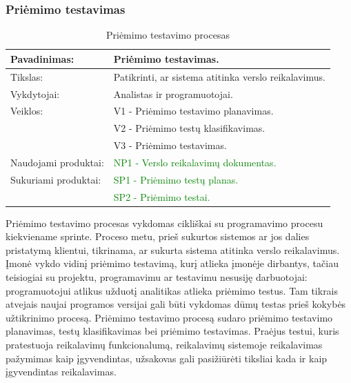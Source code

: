 \documentclass{VUMIFPSkursinis}
\begin{document}
	\subsubsection{Priėmimo testavimas}
	\begin{center}
		\begin{table}[ht]
			\caption{Priėmimo testavimo procesas}
			\begin{tabular}{ | l | l | }
				\hline
				Pavadinimas:		& Priėmimo testavimas.					\\ \hline
				Tikslas:		& Patikrinti, ar sistema atitinka verslo reikalavimus.	\\ \hline
				Vykdytojai:		& Analistas ir programuotojai.				\\ \hline
				Veiklos:		& V1 - Priėmimo testavimo planavimas.			\\
							& V2 - Priėmimo testų klasifikavimas.			\\
							& V3 - Priėmimo testavimas.				\\ \hline
				Naudojami produktai:	& \textcolor{green}{NP1 - Verslo reikalavimų dokumentas.}			\\ \hline
				Sukuriami produktai:	&\textcolor{green}{ SP1 - Priėmimo testų planas.	}			\\
						 	& \textcolor{green}{SP2 - Priėmimo testai.	}			\\ \hline
			\end{tabular}
		\end{table}
	\end{center}
	Priėmimo testavimo procesas vykdomas cikliškai su programavimo procesu kiekviename sprinte.
	Proceso metu, prieš sukurtos sistemos ar jos dalies pristatymą klientui, tikrinama, ar sukurta sistema atitinka verslo reikalavimus.
	Įmonė vykdo vidinį priėmimo testavimą, kurį atlieka įmonėje dirbantys, tačiau teisiogiai su projektu, programavimu ar testavimu nesusiję darbuotojai: programuotojui atlikus užduotį analitikas atlieka priėmimo testus.
	Tam tikrais atvejais naujai programos versijai gali būti vykdomas dūmų testas prieš kokybės užtikrinimo procesą.
	Priėmimo testavimo procesą sudaro priėmimo testavimo planavimas, testų klasifikavimas bei priėmimo testavimas.
	Praėjus testui, kuris pratestuoja reikalavimų funkcionalumą, reikalavimų sistemoje reikalavimas pažymimas kaip įgyvendintas, užsakovas gali pasižiūrėti tiksliai kada ir kaip įgyvendintas reikalavimas.
\end{document}
